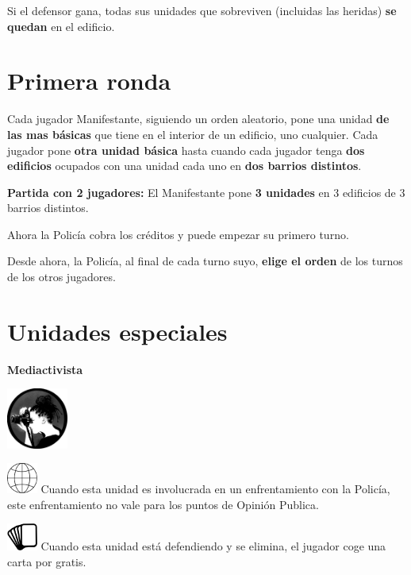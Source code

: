 \documentclass[a4paper,13pt]{scrartcl}
\begin{document}
Si el defensor gana, todas sus unidades que sobreviven (incluidas las heridas) \textbf{se quedan} en el edificio.

\section*{Primera ronda}
Cada jugador Manifestante, siguiendo un orden aleatorio, pone una unidad \textbf{de las mas b\'asicas} que tiene en el interior
de un edificio, uno cualquier. Cada jugador pone \textbf{otra unidad b\'asica} hasta cuando cada jugador tenga \textbf{dos edificios} ocupados con
una unidad cada uno en \textbf{dos barrios distintos}.

\textbf{Partida con 2 jugadores:} El Manifestante pone \textbf{3 unidades} en 3 edificios de 3 barrios distintos.

Ahora la Polic\'ia cobra los cr\'editos y puede empezar su primero turno.

Desde ahora, la Polic\'ia, al final de cada turno suyo, \textbf{elige el orden} de los turnos de los otros jugadores.

\section*{Unidades especiales}
\begin{minipage}[c]{0.2\textwidth}
\centering
\textbf{Mediactivista}
\smallskip

\includegraphics[width=2cm]{special_units-mediaactivist.png}
\end{minipage}\hfill
\begin{minipage}[c]{0.75\textwidth}
\includegraphics[width=1cm]{po.png} Cuando esta unidad es involucrada en un enfrentamiento con la Polic\'ia, este enfrentamiento no
vale para los puntos de Opini\'on Publica. 
\smallskip

\includegraphics[width=1cm]{card.png} Cuando esta unidad est\'a defendiendo y se elimina, el jugador coge una carta por gratis.
\end{minipage}
\bigskip
\end{document}
